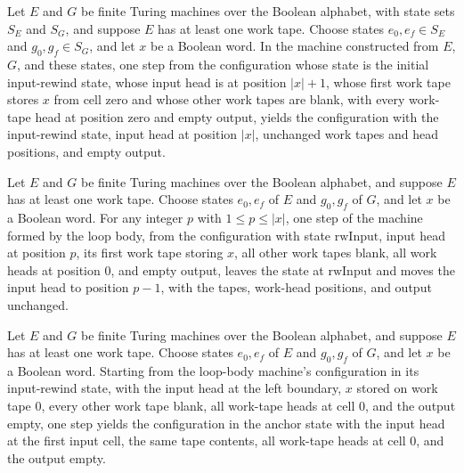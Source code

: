 \begin{theorem}
\label{Turing.rwIn0_step}
\leanok
{}
Let $E$ and $G$ be finite Turing machines over the Boolean alphabet, with state sets
$S_E$ and $S_G$, and suppose $E$ has at least one work tape. Choose states $e_0,e_f\in
S_E$ and $g_0,g_f\in S_G$, and let $x$ be a Boolean word. In the machine constructed
from $E$, $G$, and these states, one step from the configuration whose state is the
initial input-rewind state, whose input head is at position $|x|+1$, whose first work
tape stores $x$ from cell zero and whose other work tapes are blank, with every
work-tape head at position zero and empty output, yields the configuration with the
input-rewind state, input head at position $|x|$, unchanged work tapes and head
positions, and empty output.
\end{theorem}

\begin{theorem}
\label{Turing.rwInput_some}
\leanok
{}
Let $E$ and $G$ be finite Turing machines over the Boolean alphabet, and suppose $E$ has
at least one work tape. Choose states $e_0,e_f$ of $E$ and $g_0,g_f$ of $G$, and let $x$
be a Boolean word. For any integer $p$ with $1\le p\le |x|$, one step of the machine
formed by the loop body, from the configuration with state $\mathrm{rwInput}$, input
head at position $p$, its first work tape storing $x$, all other work tapes blank, all
work heads at position $0$, and empty output, leaves the state at $\mathrm{rwInput}$ and
moves the input head to position $p-1$, with the tapes, work-head positions, and output
unchanged.
\end{theorem}

\begin{theorem}
\label{Turing.rwInput_zero}
\leanok
{}
Let $E$ and $G$ be finite Turing machines over the Boolean alphabet, and suppose $E$ has
at least one work tape. Choose states $e_0,e_f$ of $E$ and $g_0,g_f$ of $G$, and let $x$
be a Boolean word. Starting from the loop-body machine's configuration in its
input-rewind state, with the input head at the left boundary, $x$ stored on work tape
$0$, every other work tape blank, all work-tape heads at cell $0$, and the output empty,
one step yields the configuration in the anchor state with the input head at the first
input cell, the same tape contents, all work-tape heads at cell $0$, and the output
empty.
\end{theorem}


